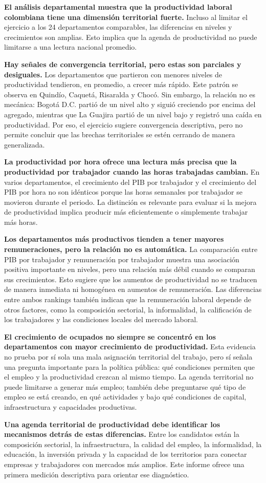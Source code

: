 \textbf{El análisis departamental muestra que la productividad laboral colombiana tiene una dimensión territorial fuerte.} Incluso al limitar el ejercicio a los 24 departamentos comparables, las diferencias en niveles y crecimientos son amplias. Esto implica que la agenda de productividad no puede limitarse a una lectura nacional promedio.

\textbf{Hay señales de convergencia territorial, pero estas son parciales y desiguales.} Los departamentos que partieron con menores niveles de productividad tendieron, en promedio, a crecer más rápido. Este patrón se observa en Quindío, Caquetá, Risaralda y Chocó. Sin embargo, la relación no es mecánica: Bogotá D.C. partió de un nivel alto y siguió creciendo por encima del agregado, mientras que La Guajira partió de un nivel bajo y registró una caída en productividad. Por eso, el ejercicio sugiere convergencia descriptiva, pero no permite concluir que las brechas territoriales se estén cerrando de manera generalizada.

\textbf{La productividad por hora ofrece una lectura más precisa que la productividad por trabajador cuando las horas trabajadas cambian.} En varios departamentos, el crecimiento del PIB por trabajador y el crecimiento del PIB por hora no son idénticos porque las horas semanales por trabajador se movieron durante el periodo. La distinción es relevante para evaluar si la mejora de productividad implica producir más eficientemente o simplemente trabajar más horas.

\textbf{Los departamentos más productivos tienden a tener mayores remuneraciones, pero la relación no es automática.} La comparación entre PIB por trabajador y remuneración por trabajador muestra una asociación positiva importante en niveles, pero una relación más débil cuando se comparan sus crecimientos. Esto sugiere que los aumentos de productividad no se traducen de manera inmediata ni homogénea en aumentos de remuneración. Las diferencias entre ambos rankings también indican que la remuneración laboral depende de otros factores, como la composición sectorial, la informalidad, la calificación de los trabajadores y las condiciones locales del mercado laboral.

\textbf{El crecimiento de ocupados no siempre se concentró en los departamentos con mayor crecimiento de productividad.} Esta evidencia no prueba por sí sola una mala asignación territorial del trabajo, pero sí señala una pregunta importante para la política pública: qué condiciones permiten que el empleo y la productividad crezcan al mismo tiempo. La agenda territorial no puede limitarse a generar más empleo; también debe preguntarse qué tipo de empleo se está creando, en qué actividades y bajo qué condiciones de capital, infraestructura y capacidades productivas.

\textbf{Una agenda territorial de productividad debe identificar los mecanismos detrás de estas diferencias.} Entre los candidatos están la composición sectorial, la infraestructura, la calidad del empleo, la informalidad, la educación, la inversión privada y la capacidad de los territorios para conectar empresas y trabajadores con mercados más amplios. Este informe ofrece una primera medición descriptiva para orientar ese diagnóstico.
